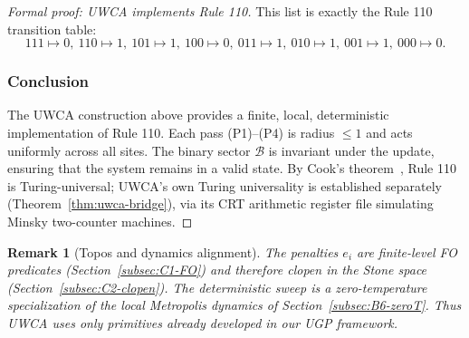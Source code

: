 \documentclass[12pt]{article}
\newtheorem{remark}[theorem]{Remark}
\numberwithin{equation}{section}
\begin{document}
\begin{proof}[Formal proof: UWCA implements Rule 110]
This list is exactly the Rule 110 transition table:
\[
111\!\mapsto\!0,\ 110\!\mapsto\!1,\ 101\!\mapsto\!1,\ 100\!\mapsto\!0,\ 011\!\mapsto\!1,\ 010\!\mapsto\!1,\ 001\!\mapsto\!1,\ 000\!\mapsto\!0.
\]

\subsubsection*{Conclusion}

The UWCA construction above provides a finite, local, deterministic implementation of Rule 110. Each pass (P1)--(P4) is radius $\le1$ and acts uniformly across all sites. The binary sector $\mathcal B$ is invariant under the update, ensuring that the system remains in a valid state. By Cook's theorem~\cite{cook2004rule110}, Rule 110 is Turing-universal; UWCA's own Turing universality is established separately (Theorem~\ref{thm:uwca-bridge}), via its CRT arithmetic register file simulating Minsky two-counter machines.
\end{proof}


\begin{remark}[Topos and dynamics alignment]
The penalties $e_i$ are finite-level FO predicates (Section~\ref{subsec:C1-FO}) and therefore clopen in the Stone space (Section~\ref{subsec:C2-clopen}). The deterministic sweep is a zero-temperature specialization of the local Metropolis dynamics of Section~\ref{subsec:B6-zeroT}. Thus UWCA uses only primitives already developed in our UGP framework.
\end{remark}
\end{document}
